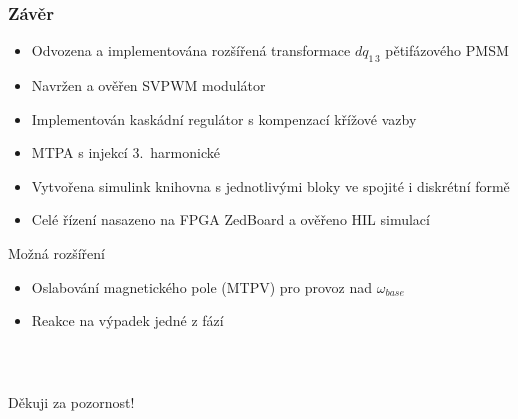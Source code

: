 \documentclass[%
  12pt,       				%
	t,                  %
	aspectratio=1610,   %
	unicode,						%
]{beamer}				    	%
\begin{document}
\begin{frame}
	\frametitle{Závěr}
	\begin{itemize}
		\item Odvozena a implementována {rozšířená transformace $dq_{1\,3}$} pětifázového PMSM
		\item Navržen a ověřen {SVPWM modulátor} 
		\item Implementován {kaskádní regulátor} s kompenzací křížové vazby
		\item {MTPA s injekcí 3.~harmonické}
		\item Vytvořena simulink knihovna s jednotlivými bloky ve spojité i diskrétní formě
		\item Celé řízení {nasazeno na FPGA ZedBoard} a ověřeno HIL simulací
		
	\end{itemize}
	\vspace{1ex}
	\begin{block}{Možná rozšíření}
		\begin{itemize}
			\item Oslabování magnetického pole (MTPV) pro provoz nad $\omega_{base}$
			\item Reakce na výpadek jedné z fází
		\end{itemize}
	\end{block}
\end{frame}


\begin{frame}[c]
	\frametitle{\mbox{ }}
	\begin{center}
		{\Huge Děkuji za pozornost!}
	\end{center}
\end{frame}
\end{document}
